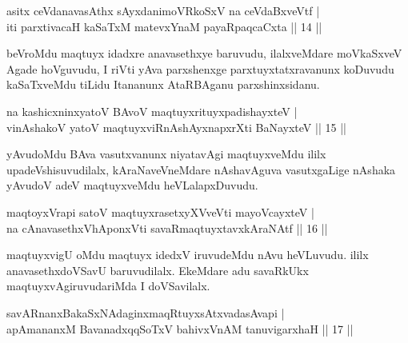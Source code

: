 \begin{shl}
asitx ceVdanavasAthx sAyxdanimoVRkoSxV na ceVdaBxveVtf |\\
iti parxtivacaH kaSaTxM matevxYnaM payaRpaqcaCxta \hfill || 14 ||
\end{shl}

\begin{artha}
beVroMdu maqtuyx idadxre anavasethxye baruvudu, ilalxveMdare moVkaSxveV Agade hoVguvudu, I riVti yAva parxshenxge parxtuyxtatxravanunx koDuvudu kaSaTxveMdu tiLidu Itananunx AtaRBAganu parxshinxsidanu.
\end{artha}




\begin{shl}
na kashicxninxyatoV BAvoV maqtuyxrituyxpadishayxteV |\\
vinAshakoV yatoV maqtuyxviRnAshAyxnapxrXti BaNayxteV \hfill || 15 ||
\end{shl}

\begin{artha}
yAvudoMdu BAva vasutxvanunx niyatavAgi maqtuyxveMdu ililx upadeVshisuvudilalx, 
kAraNaveVneMdare nAshavAguva vasutxgaLige nAshaka yAvudoV adeV maqtuyxveMdu heVLalapxDuvudu.
\end{artha}


\begin{shl}
maqtoyxVrapi satoV maqtuyxrasetxyXVveVti mayoVcayxteV |\\
na cAnavasethxVhA\s \s ponxVti savaRmaqtuyxtavxkAraNAtf \hfill || 16 ||
\end{shl}

\begin{artha}
maqtuyxvigU oMdu maqtuyx idedxV iruvudeMdu nAvu heVLuvudu. ililx anavasethxdoVSavU 
baruvudilalx. EkeMdare adu savaRkUkx maqtuyxvAgiruvudariMda I doVSavilalx.
\end{artha}

\begin{shl}
savARnanxBakaSxNAdaginxmaqRtuyxsAtxvadasAvapi |\\
apAmananxM BavanadxqqSoTxV bahivxVnAM tanuvigarxhaH \hfill || 17 ||
\end{shl}

